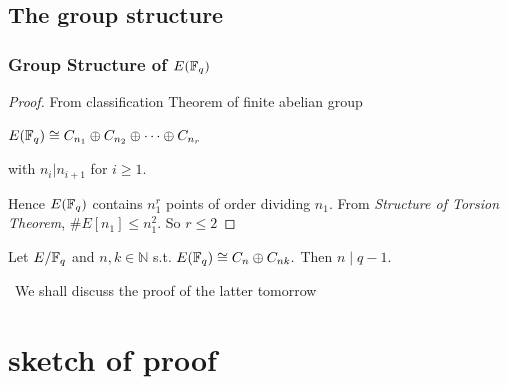 \documentclass[10pt,handout]{beamer} %
\begin{document}
\subsection{The group structure}
\begin{frame}\frametitle{Group Structure of $E(\mathbb F_q)$}

\pause

\begin{proof}
From classification Theorem of finite abelian group\\
\centerline{$E(\mathbb F_q)\cong  C_{n_1}\oplus C_{n_2}\oplus\cdots\oplus C_{n_r}$}
with $n_i|n_{i+1}$ for $i\ge1$.\pause

Hence $E(\mathbb F_q)$ contains $n_1^r$ points of order dividing $n_1$. From
\emph{Structure of Torsion Theorem}, $\#E[n_1]\le n_1^2$.
So $r\le2$\end{proof}\pause

\begin{theorem}  Let $E/\mathbb F_q$ and $n,k\in\mathbb N$ s.t.
$E(\mathbb F_q)\cong C_n\oplus C_{nk}.$
Then $n\mid q-1$.
\end{theorem}\pause

\ \hfil We shall discuss the proof of the latter tomorrow
\end{frame}


\section{sketch of proof}
\end{document}
